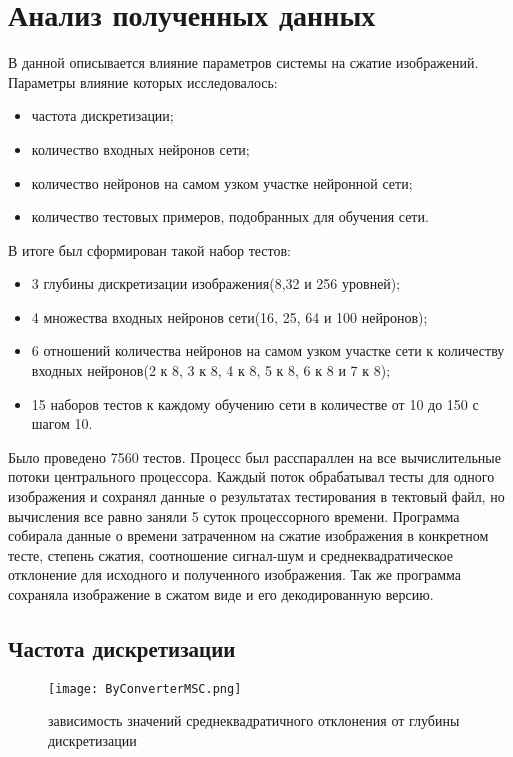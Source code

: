 \section{Анализ полученных данных}
\label{sec:analysis}

В данной описывается влияние параметров системы на сжатие изображений.
Параметры влияние которых исследовалось:

\begin{itemize}
  \item частота дискретизации;
  \item количество входных нейронов сети;
  \item количество нейронов на самом узком участке нейронной сети;
  \item количество тестовых примеров, подобранных для обучения сети.
\end{itemize}

В итоге был сформирован такой набор тестов:

\begin{itemize}
  \item 3 глубины дискретизации изображения(8,32 и 256 уровней);
  \item 4 множества входных нейронов сети(16, 25, 64 и 100 нейронов);
  \item 6 отношений количества нейронов на самом узком участке сети к количеству входных нейронов(2 к 8, 3 к 8, 4 к 8, 5 к 8, 6 к 8 и 7 к 8);
  \item 15 наборов тестов к каждому обучению сети в количестве от 10 до 150 с шагом 10.
\end{itemize}

Было проведено 7560 тестов. Процесс был расспараллен на все вычислительные потоки центрального процессора.
Каждый поток обрабатывал тесты для одного изображения и сохранял данные о результатах тестирования в тектовый файл,
но вычисления все равно заняли 5 суток процессорного времени.
Программа собирала данные о времени затраченном на сжатие изображения в конкретном тесте, степень сжатия,
соотношение сигнал-шум и среднеквадратическое отклонение для исходного и полученного изображения.
Так же программа сохраняла изображение в сжатом виде и его декодированную версию.

\subsection{Частота дискретизации}
\label{sub:analysis:discrete}

\begin{figure}[ht]
\centering
  \texttt{[image: ByConverterMSC.png]}
  \caption{ зависимость значений среднеквадратичного отклонения от глубины дискретизации }
  \label{fig:by_converter_msc}
\end{figure}

